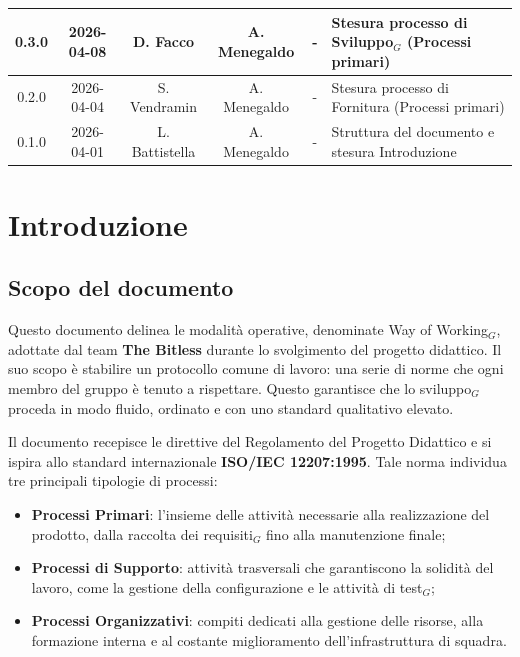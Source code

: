 \documentclass[a4paper, 10pt]{article}
\begin{document}
\begin{longtable}{|c|c|c|c|c|p{3cm}|}
    0.3.0  & 2026-04-08 & D. Facco & A. Menegaldo & - & Stesura processo di Sviluppo$_G$ (Processi primari) \\ \hline

    0.2.0  & 2026-04-04 & S. Vendramin & A. Menegaldo & - & Stesura processo di Fornitura (Processi primari) \\ \hline

    0.1.0  & 2026-04-01 & L. Battistella & A. Menegaldo & - & Struttura del documento e stesura Introduzione \\ \hline

\end{longtable}
\endgroup

\newpage
\tableofcontents 

\newpage

\section{Introduzione}

\subsection{Scopo del documento}
Questo documento delinea le modalità operative, denominate Way of Working$_G$, adottate dal team \textbf{The Bitless} durante lo svolgimento del progetto didattico. Il suo scopo è stabilire un protocollo comune di lavoro: una serie di norme che ogni membro del gruppo è tenuto a rispettare. Questo garantisce che lo sviluppo$_G$ proceda in modo fluido, ordinato e con uno standard qualitativo elevato.

Il documento recepisce le direttive del Regolamento del Progetto Didattico e si ispira allo standard internazionale \textbf{ISO/IEC 12207:1995}. Tale norma individua tre principali tipologie di processi:
\begin{itemize}
    \item \textbf{Processi Primari}: l'insieme delle attività necessarie alla realizzazione del prodotto, dalla raccolta dei requisiti$_G$ fino alla manutenzione finale;
    \item \textbf{Processi di Supporto}: attività trasversali che garantiscono la solidità del lavoro, come la gestione della configurazione e le attività di test$_G$;
    \item \textbf{Processi Organizzativi}: compiti dedicati alla gestione delle risorse, alla formazione interna e al costante miglioramento dell'infrastruttura di squadra.
\end{itemize}
\end{document}
